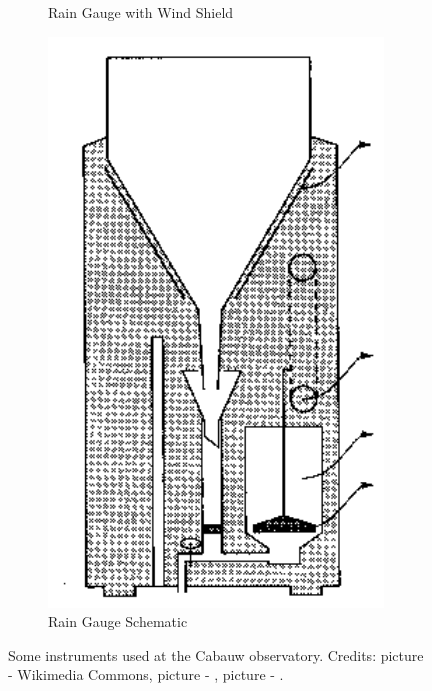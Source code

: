 \documentclass[a4paper]{book}
\begin{document}
\begin{figure}
\begin{subfigure}[t]{0.28\textwidth}
        \caption{Rain Gauge with Wind Shield}
        \label{fig:rain_gauge_shield}
    \end{subfigure}
    \hfill
    \begin{subfigure}[t]{0.18\textwidth}
        \centering
        \includegraphics[width=\textwidth]{images/rain_gauge}
        \caption{Rain Gauge Schematic}
        \label{fig:rain_gauge_schematic}
    \end{subfigure}
    \caption[Some instruments used at the Cabauw observatory.]{Some instruments used at the Cabauw observatory. Credits: picture  - Wikimedia Commons\protect\footnotemark, picture  - \cite{windsheld_rain}, picture  - \cite{rain}.}
	\label{fig:cabauw_instruments}
\end{figure}
\end{document}
